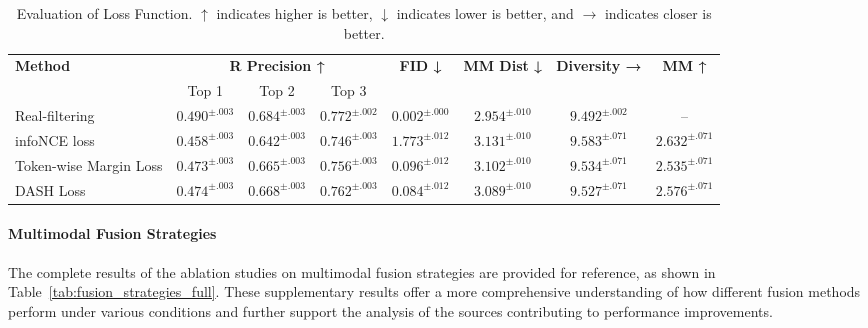 \documentclass[a4paper,12pt]{article}
\begin{document}
\begin{table}[t]
\centering
\scriptsize
\renewcommand{\arraystretch}{1}
\setlength{\tabcolsep}{4.5pt}  %
\begin{tabular}{l|ccc|c|c|c|c}
\toprule
\multirow{2}{*}{\textbf{Method}} & \multicolumn{3}{c|}{\textbf{R Precision ↑}} & \multirow{2}{*}{\textbf{FID ↓}} & \multirow{2}{*}{\textbf{MM Dist ↓}} & \multirow{2}{*}{\textbf{Diversity →}} & \multirow{2}{*}{\textbf{MM ↑}} \\
 & Top 1 & Top 2 & Top 3 &  &  &  & \\
\midrule
Real-filtering    & $0.490^{\pm.003}$ & $0.684^{\pm.003}$ & $0.772^{\pm.002}$ & $0.002^{\pm.000}$ & $2.954^{\pm.010}$ & $9.492^{\pm.002}$ & -- \\ \midrule
infoNCE loss       & $0.458^{\pm.003}$ & $0.642^{\pm.003}$ & $0.746^{\pm.003}$ & $1.773^{\pm.012}$ & $3.131^{\pm.010}$ & $9.583^{\pm.071}$ & $2.632^{\pm.071}$ \\ 
Token-wise Margin Loss       & $0.473^{\pm.003}$ & $0.665^{\pm.003}$ & $0.756^{\pm.003}$ & $0.096^{\pm.012}$ & $3.102^{\pm.010}$ & $9.534^{\pm.071}$ & $2.535^{\pm.071}$ \\ \midrule
DASH Loss       & $0.474^{\pm.003}$ & $0.668^{\pm.003}$ & $0.762^{\pm.003}$ & $0.084^{\pm.012}$ & $3.089^{\pm.010}$ & $9.527^{\pm.071}$ & $2.576^{\pm.071}$ \\ 

\bottomrule
\end{tabular}
\caption{ 
Evaluation of Loss Function. $\uparrow$ indicates higher is better, $\downarrow$ indicates lower is better, and $\rightarrow$ indicates closer is better. 
}
\label{tab:comparison_loss}
\end{table}

\paragraph{Multimodal Fusion Strategies}
The complete results of the ablation studies on multimodal fusion strategies are provided for reference, as shown in Table~\ref{tab:fusion_strategies_full}. These supplementary results offer a more comprehensive understanding of how different fusion methods perform under various conditions and further support the analysis of the sources contributing to performance improvements.
\end{document}
